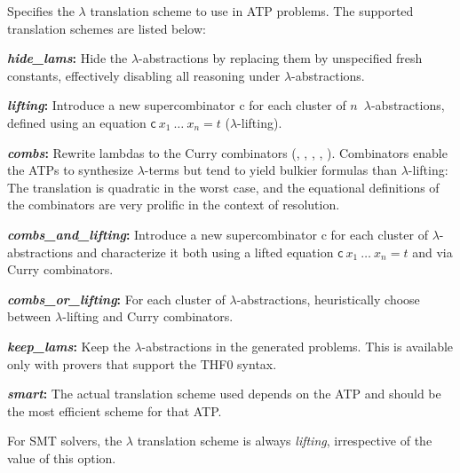 \documentclass[a4paper,12pt]{article}
\newcommand\const[1]{\textsf{#1}}
\begin{document}
\begin{enum}
Specifies the $\lambda$ translation scheme to use in ATP problems. The supported
translation schemes are listed below:

\begin{enum}
\item[\labelitemi] \textbf{\textit{hide\_lams}:} Hide the $\lambda$-abstractions
by replacing them by unspecified fresh constants, effectively disabling all
reasoning under $\lambda$-abstractions.

\item[\labelitemi] \textbf{\textit{lifting}:} Introduce a new
supercombinator \const{c} for each cluster of $n$~$\lambda$-abstractions,
defined using an equation $\const{c}~x_1~\ldots~x_n = t$ ($\lambda$-lifting).

\item[\labelitemi] \textbf{\textit{combs}:} Rewrite lambdas to the Curry
combinators (, , , , ). Combinators
enable the ATPs to synthesize $\lambda$-terms but tend to yield bulkier formulas
than $\lambda$-lifting: The translation is quadratic in the worst case, and the
equational definitions of the combinators are very prolific in the context of
resolution.

\item[\labelitemi] \textbf{\textit{combs\_and\_lifting}:} Introduce a new
supercombinator \const{c} for each cluster of $\lambda$-abstractions and characterize it both using a
lifted equation $\const{c}~x_1~\ldots~x_n = t$ and via Curry combinators.

\item[\labelitemi] \textbf{\textit{combs\_or\_lifting}:} For each cluster of
$\lambda$-abstractions, heuristically choose between $\lambda$-lifting and Curry
combinators.

\item[\labelitemi] \textbf{\textit{keep\_lams}:}
Keep the $\lambda$-abstractions in the generated problems. This is available
only with provers that support the THF0 syntax.

\item[\labelitemi] \textbf{\textit{smart}:} The actual translation scheme used
depends on the ATP and should be the most efficient scheme for that ATP.
\end{enum}

For SMT solvers, the $\lambda$ translation scheme is always \textit{lifting},
irrespective of the value of this option.


\end{enum}
\end{document}
